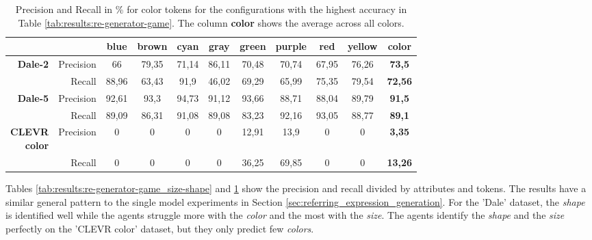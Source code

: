 \begin{table}[ht]
    \centering
    \begin{tabular}{rr|cccccccc|c}
        \toprule
                                         &             & {blue}  & {brown} & {cyan}  & {gray}  & {green} & {purple} & {red}   & {yellow} & \textbf{color}   \\\midrule
        \multirow{2}{*}{\textbf{Dale-2}} & {Precision} & {66}    & {79,35} & {71,14} & {86,11} & {70,48} & {70,74}  & {67,95} & {76,26}  & \textbf{73,5}    \\
                                         & {Recall}    & {88,96} & {63,43} & {91,9}  & {46,02} & {69,29} & {65,99}  & {75,35} & {79,54}  & \textbf{72,56}   \\\midrule
        \multirow{2}{*}{\textbf{Dale-5}} & {Precision} & {92,61} & {93,3}  & {94,73} & {91,12} & {93,66} & {88,71}  & {88,04} & {89,79}  & \textbf{91,5}    \\
                                         & {Recall}    & {89,09} & {86,31} & {91,08} & {89,08} & {83,23} & {92,16}  & {93,05} & {88,77}  & {\textbf{89,1}}  \\\midrule
        \multirowcell{2}[0pt][r]{\textbf{CLEVR}                                                                                                             \\\textbf{color}} & {Precision}           & {0} & {0} & {0} & {0} & {12,91} & {13,9}  & {0} & {0}   & \textbf{3,35} \\
                                         & {Recall}    & {0}     & {0}     & {0}     & {0}     & {36,25} & {69,85}  & {0}     & {0}      & {\textbf{13,26}} \\
        \bottomrule
    \end{tabular}
    \caption{Precision and Recall in \% for color tokens for the configurations with the highest accuracy in Table \ref{tab:results:re-generator-game}. The column \textbf{color} shows the average across all colors.}
    \label{tab:results:re-generator-game_color}
\end{table}

Tables \ref{tab:results:re-generator-game_size-shape} and \ref{tab:results:re-generator-game_color} show the precision and recall divided by attributes and tokens.
The results have a similar general pattern to the single model experiments in Section \ref{sec:referring_expression_generation}.
For the 'Dale' dataset, the \emph{shape} is identified well while the agents struggle more with the \emph{color} and the most with the \emph{size}.
The agents identify the \emph{shape} and the \emph{size} perfectly on the 'CLEVR color' dataset, but they only predict few \emph{colors}.

